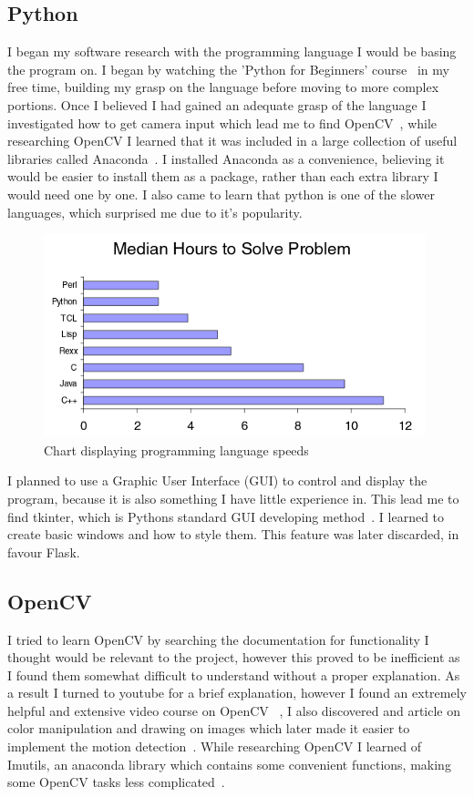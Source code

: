  \subsection{Python}
 I began my software research with the programming language I would be basing the program on. I began by watching the 'Python for Beginners' course~\cite{pythonForBegin} in my free time, building my grasp on the language before moving to more complex portions.  Once I believed I had gained an adequate grasp of the language I investigated how to get camera input which lead me to find OpenCV~\cite{openCV}, while researching OpenCV I learned that it was included in a large collection of useful libraries called Anaconda~\cite{anacondaLibs}. I installed Anaconda as a convenience, believing it would be easier to install them as a package, rather than each extra library I would need one by one. I also came to learn that python is one of the slower languages, which surprised me due to it's popularity.  
  \begin{figure}[!htbp] 
      \centering
     \includegraphics{img/pythonSlow.png}
      \caption{Chart displaying programming language speeds}
      \label{fig:my_label}
  \end{figure}    

I planned to use a Graphic User Interface (GUI) to control and display the program, because it is also something I have little experience in. This lead me to find tkinter, which is Pythons standard GUI developing method~\cite{tkinter}. I learned to create basic windows and how to style them. This feature was later discarded, in favour Flask.
 \subsection{OpenCV}
 I tried to learn OpenCV by searching the documentation for functionality I thought would be relevant to the project, however this proved to be inefficient as I found them somewhat difficult to understand without a proper explanation. As a  result I turned to youtube for a brief explanation, however I found an extremely helpful and extensive video course on OpenCV ~\cite{openCVCourse}, I also discovered and article on color manipulation and drawing on images which later made it easier to implement the motion detection~\cite{openCVArticle}. While researching OpenCV I learned of Imutils, an anaconda library which contains some convenient functions, making some OpenCV tasks less complicated~\cite{imutils}.
